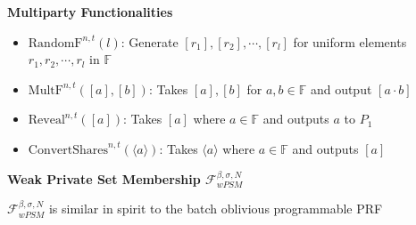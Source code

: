 \begin{frame}

    \textbf{Multiparty Functionalities}

    \vspace{0.5cm}
    
    \begin{itemize}
        \item     $\text{RandomF}^{n,t}(l)$: Generate $[r_1],[r_2],\cdots,[r_l]$ for uniform elements $r_1,r_2,\cdots,r_l$ in $\mathbb{F} $
        
        \item     $\text{MultF}^{n,t}([a],[b])$: Takes $[a],[b]$ for $a,b \in \mathbb{F} $ and output $[a \cdot b]$

        \item $\text{Reveal}^{n,t}([a])$: Takes $[a]$ where $a \in \mathbb{F} $ and outputs $a$ to $P_1$
        \item $\text{ConvertShares}^{n,t}(\langle a \rangle)$: Takes $\langle a \rangle$ where $a \in \mathbb{F} $ and outputs $[a]$ 
        

    \end{itemize}

\end{frame}


\begin{frame}

    \centering\textbf{Weak Private Set Membership $\mathcal{F}_{wPSM}^{\beta,\sigma,N}$}

    \vspace{0.25cm}

    \centering{}

    \vspace{0.25cm}

    $\mathcal{F}_{wPSM}^{\beta,\sigma,N}$ is similar in spirit to the batch oblivious programmable PRF

\end{frame}

